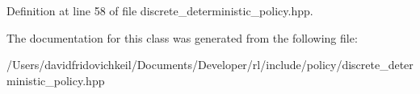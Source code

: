 Definition at line 58 of file discrete\+\_\+deterministic\+\_\+policy.\+hpp.



The documentation for this class was generated from the following file\+:\begin{DoxyCompactItemize}
\item 
/\+Users/davidfridovichkeil/\+Documents/\+Developer/rl/include/policy/discrete\+\_\+deterministic\+\_\+policy.\+hpp\end{DoxyCompactItemize}
